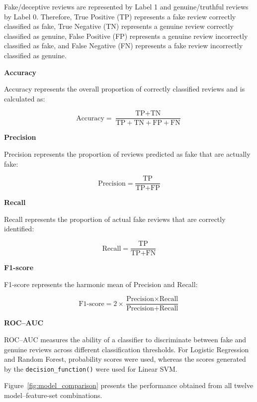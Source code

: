 \documentclass[12pt,a4paper]{report}
\begin{document}
Fake/deceptive reviews are represented by Label 1 and genuine/truthful
reviews by Label 0. Therefore, True Positive (TP) represents a fake
review correctly classified as fake, True Negative (TN) represents a
genuine review correctly classified as genuine, False Positive (FP)
represents a genuine review incorrectly classified as fake, and False
Negative (FN) represents a fake review incorrectly classified as
genuine.

\noindent\textbf{Accuracy}

Accuracy represents the overall proportion of correctly classified
reviews and is calculated as:

\begin{equation}
\text{Accuracy} =
\frac{\text{TP} + \text{TN}}
{\text{TP} + \text{TN} + \text{FP} + \text{FN}}
\end{equation}

\noindent\textbf{Precision}

Precision represents the proportion of reviews predicted as fake that
are actually fake:

\begin{equation}
\text{Precision} =
\frac{\text{TP}}
{\text{TP} + \text{FP}}
\end{equation}

\noindent\textbf{Recall}

Recall represents the proportion of actual fake reviews that are
correctly identified:

\begin{equation}
\text{Recall} =
\frac{\text{TP}}
{\text{TP} + \text{FN}}
\end{equation}

\noindent\textbf{F1-score}

F1-score represents the harmonic mean of Precision and Recall:

\begin{equation}
\text{F1-score} =
2 \times
\frac{\text{Precision} \times \text{Recall}}
{\text{Precision} + \text{Recall}}
\end{equation}

\noindent\textbf{ROC--AUC}

ROC--AUC measures the ability of a classifier to discriminate between
fake and genuine reviews across different classification thresholds.
For Logistic Regression and Random Forest, probability scores were
used, whereas the scores generated by the
\texttt{decision\_function()} were used for Linear SVM.

Figure~\ref{fig:model_comparison} presents the performance obtained
from all twelve model--feature-set combinations.
\end{document}
